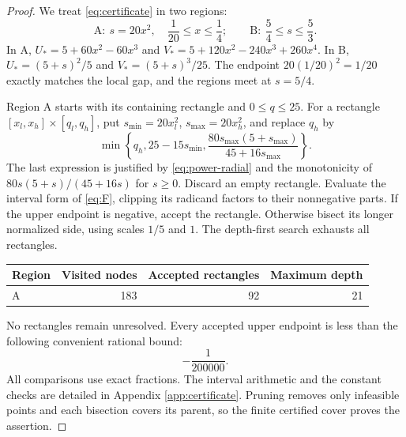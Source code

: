 \documentclass[11pt]{article}
\theoremstyle{remark}
\numberwithin{equation}{section}
\begin{document}
\begin{proof}
We treat \eqref{eq:certificate} in two regions:
\[
 \mathrm A:\ s=20x^2,\quad\frac1{20}\le x\le\frac14;
 \qquad
 \mathrm B:\ \frac54\le s\le\frac53.
\]
In A, $U_*=5+60x^2-60x^3$ and
$V_*=5+120x^2-240x^3+260x^4$.
In B, $U_*=(5+s)^2/5$ and $V_*=(5+s)^3/25$.
The endpoint $20(1/20)^2=1/20$ exactly matches the local gap,
and the regions meet at $s=5/4$.

Region A starts with its containing rectangle and $0\le q\le25$.
For a rectangle $[x_l,x_h]\times[q_l,q_h]$, put
$s_{\min}=20x_l^2$, $s_{\max}=20x_h^2$, and replace $q_h$ by
\[
 \min\left\{q_h,25-15s_{\min},
            \frac{80s_{\max}(5+s_{\max})}{45+16s_{\max}}\right\}.
\]
The last expression is justified by \eqref{eq:power-radial} and the
monotonicity of $80s(5+s)/(45+16s)$ for $s\ge0$.
Discard an empty rectangle. Evaluate the interval form of
\eqref{eq:F}, clipping its radicand factors to their nonnegative parts.
If the upper endpoint is negative, accept the rectangle.
Otherwise bisect its longer normalized side, using scales $1/5$ and
$1$. The depth-first search exhausts all rectangles.

\begin{center}
\begin{tabular}{lrrr}
\toprule
Region & Visited nodes & Accepted rectangles & Maximum depth\\
\midrule
A & 183 & 92 & 21\\
\bottomrule
\end{tabular}
\end{center}
No rectangles remain unresolved. Every accepted upper endpoint is less
than the following convenient rational bound:
\begin{equation}\label{eq:certificate-margins}
 -\frac1{200000}.
\end{equation}
All comparisons use exact fractions. The interval arithmetic and the
constant checks are detailed in Appendix \ref{app:certificate}.
Pruning removes only infeasible points and each bisection covers its
parent, so the finite certified cover proves the assertion.


\end{proof}
\end{document}
